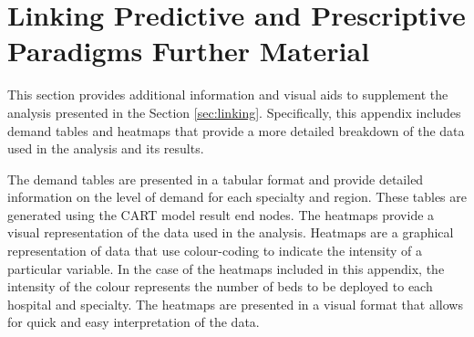 \documentclass[thesis.tex]{subfiles}
\begin{document}
\chapter{Linking Predictive and Prescriptive Paradigms Further Material}\label{app:linkeddemands}

\normalsize
This section provides additional information and visual aids to supplement the analysis presented in the Section \ref{sec:linking}. Specifically, this appendix includes demand tables and heatmaps that provide a more detailed breakdown of the data used in the analysis and its results.

The demand tables are presented in a tabular format and provide detailed information on the level of demand for each specialty and region. These tables are generated using the CART model result end nodes. The heatmaps provide a visual representation of the data used in the analysis. Heatmaps are a graphical representation of data that use colour-coding to indicate the intensity of a particular variable. In the case of the heatmaps included in this appendix, the intensity of the colour represents the number of beds to be deployed to each hospital and specialty. The heatmaps are presented in a visual format that allows for quick and easy interpretation of the data.
\end{document}
